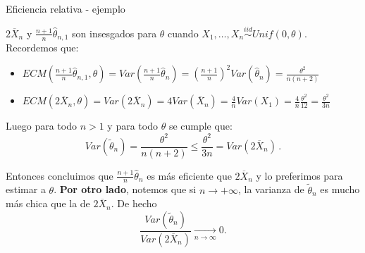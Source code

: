 \documentclass{beamer}
\theoremstyle{definition}
\newcommand{\ton}{\underset{n\to\infty}{\longrightarrow}}
\begin{document}
\begin{frame}{\color{rosee}Eficiencia relativa - ejemplo}\small
 
    {\small$2{\overline{X}_{n}}$} y
    {\small$\frac{n+1}{n} \widehat{\theta}_{n,1}$} son insesgados para $\theta$ cuando {\small $X_1,\dots,X_n\stackrel{iid}{\sim} Unif(0,\theta)$}. Recordemos que:\medskip
    \begin{itemize}[leftmargin=*]
        \item $ECM\left(\frac{n+1}{n} \widehat{\theta}_{n,1},\theta\right)=Var\left(\frac{n+1}{n}
      \widehat{\theta}_{n}\right)=\left(\frac{n+1}{n}
    \right)^{2}Var(\widehat{\theta}_{n}) = \frac{\theta^{2}}{n(n+2)}$
    \item $ECM\left(2{\overline{X}_{n}},\theta\right)=Var\left(2{\overline{X}_{n}}\right)=4 Var(\overline{X}_{n}) =
    \frac{4}{n} Var(X_{1})=\frac{4}{n} \frac{\theta^{2}}{12} =
    \frac{\theta^2}{3n}$
    \end{itemize}
    Luego para todo $n>1$ y para todo $\theta$ se cumple que:
    \[Var(\widetilde{\theta}_n) = \frac{\theta^{2}}{n(n+2)} \leq \frac{\theta^{2}}{3n} = Var(2{\overline{X}_{n}})\,.\]
  

    Entonces concluimos que $\frac{n+1}{n} \widehat{\theta}_{n}$
    es m\'as eficiente que $2{\overline{X}_{n}}$ y lo preferimos para estimar a $\theta$. \textbf{Por otro lado}, notemos que si $n\to +\infty$, la varianza de
    $\widetilde{\theta}_{n}$ es mucho m\'as chica que la de
    $2{\overline{X}_{n}}$. De hecho
    \[\frac{Var(\widetilde{\theta}_{n})}{Var(2{\overline{X}_{n}})} \ton 0.\]
 
\end{frame}
\end{document}
